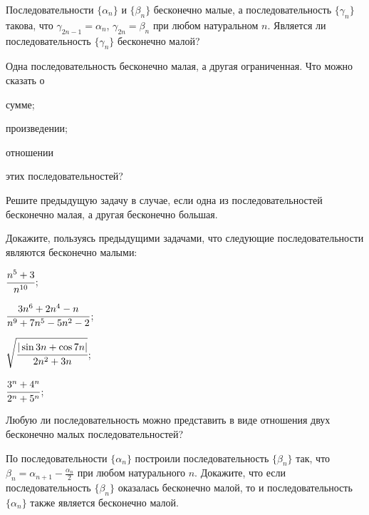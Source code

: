 \documentclass[a4paper, 12pt, num=25]{listok}
\begin{document}
\begin{problem}
	Последовательности $\{\alpha_n\}$ и $\{\beta_n\}$ бесконечно малые, а последовательность $\{\gamma_n\}$ такова,
	что $\gamma_{2n-1} = \alpha_n$, $\gamma_{2n} = \beta_n$ при любом натуральном $n$.
	Является ли последовательность $\{\gamma_n\}$ бесконечно малой?
\end{problem}
\begin{problem}
	Одна последовательность бесконечно малая, а другая ограниченная.
	Что можно сказать о
	\begin{probparts}
		\item сумме;
		\item произведении;
		\item отношении
	\end{probparts}
	этих последовательностей?
\end{problem}
\begin{problem}
	Решите предыдущую задачу в случае, если одна из последовательностей бесконечно малая, а другая бесконечно большая.
\end{problem}
\begin{problem}
	Докажите, пользуясь предыдущими задачами, что следующие последовательности являются бесконечно малыми:
	\begin{multienum}{4}
		\item $\cfrac{n^5 + 3}{n^{10}}$;
		\item $\cfrac{3n^6 + 2n^4 - n}{n^9 + 7n^5 - 5n^2 - 2}$;
		\item $\sqrt{\cfrac{|\sin{3n} + \cos{7n}|}{2n^2 + 3n}}$;
		\item $\cfrac{3^n + 4^n}{2^n + 5^n}$;
	\end{multienum}
\end{problem}
\begin{problem}
	Любую ли последовательность можно представить в виде отношения двух бесконечно малых последовательностей?
\end{problem}
\begin{problem}
	По последовательности $\{\alpha_n\}$ построили последовательность $\{\beta_n\}$ так, что 
	$\beta_n = \alpha_{n + 1} - \frac{\alpha_n}2$ при любом натурального $n$.
	Докажите, что если последовательность $\{\beta_n\}$ оказалась бесконечно малой,
	то и последовательность $\{\alpha_n\}$ также является бесконечно малой.
\end{problem}
\end{document}
